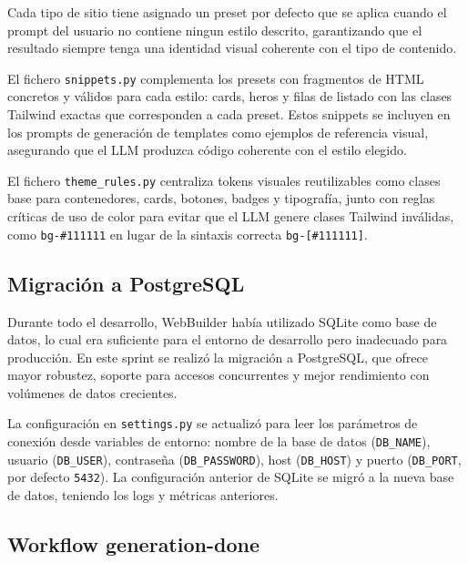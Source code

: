 Cada tipo de sitio tiene asignado un preset por defecto que se aplica cuando el prompt del usuario no contiene ningun estilo descrito, garantizando que el resultado siempre tenga una identidad visual coherente con el tipo de contenido.

El fichero \texttt{snippets.py} complementa los presets con fragmentos de HTML concretos y válidos para cada estilo: cards, heros y filas de listado con las clases Tailwind exactas que corresponden a cada preset. Estos snippets se incluyen en los prompts de generación de templates como ejemplos de referencia visual, asegurando que el LLM produzca código coherente con el estilo elegido.

El fichero \texttt{theme\_rules.py} centraliza tokens visuales reutilizables como clases base para contenedores, cards, botones, badges y tipografía, junto con reglas críticas de uso de color para evitar que el LLM genere clases Tailwind inválidas, como \texttt{bg-\#111111} en lugar de la sintaxis correcta \texttt{bg-[\#111111]}.

\subsection{Migración a PostgreSQL}
\label{subsec:migracion-postgresql}

Durante todo el desarrollo, WebBuilder había utilizado SQLite como base de datos, lo cual era suficiente para el entorno de desarrollo pero inadecuado para producción. En este sprint se realizó la migración a PostgreSQL, que ofrece mayor robustez, soporte para accesos concurrentes y mejor rendimiento con volúmenes de datos crecientes.

La configuración en \texttt{settings.py} se actualizó para leer los parámetros de conexión desde variables de entorno: nombre de la base de datos (\texttt{DB\_NAME}), usuario (\texttt{DB\_USER}), contraseña (\texttt{DB\_PASSWORD}), host (\texttt{DB\_HOST}) y puerto (\texttt{DB\_PORT}, por defecto \texttt{5432}). La configuración anterior de SQLite se migró a la nueva base de datos, teniendo los logs y métricas anteriores.


\subsection{Workflow generation-done}
\label{subsec:workflow-generation-done}

